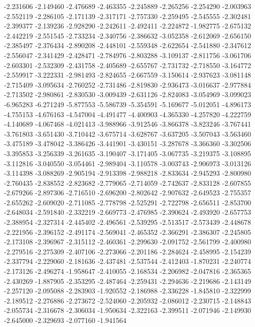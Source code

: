 -2.231606
-2.149460
-2.476689
-2.463355
-2.245889
-2.265256
-2.254290
-2.003963
-2.552119
-2.286105
-2.171139
-2.317171
-2.757330
-2.259495
-2.545555
-2.302481
-2.399377
-2.139236
-2.928290
-2.242611
-2.492411
-2.224872
-1.982775
-2.675132
-2.442219
-2.551545
-2.733234
-2.340756
-2.386632
-3.052358
-2.612069
-2.656150
-2.385497
-2.376434
-2.890208
-2.448101
-2.559348
-2.622654
-2.541880
-2.347612
-2.556047
-2.341429
-2.428471
-2.784976
-2.803288
-3.109137
-2.811756
-3.061706
-2.603301
-2.532309
-2.431758
-2.405689
-2.655767
-2.731732
-2.718550
-3.164772
-2.559917
-3.222331
-2.981493
-2.824655
-2.667559
-3.150614
-2.937623
-3.081148
-2.715409
-3.095634
-2.760252
-2.731486
-2.819830
-2.936473
-3.016637
-2.977884
-2.713502
-2.980861
-2.830530
-3.009439
-2.631126
-2.824083
-3.054969
-3.099023
-6.965283
-6.271249
-5.877553
-5.586739
-5.354591
-5.169677
-5.012051
-4.896173
-4.755153
-4.676163
-4.547004
-4.491477
-4.400903
-4.365330
-4.257820
-4.222759
-4.140689
-4.067468
-4.021413
-3.988966
-3.912546
-3.866378
-3.823246
-3.767441
-3.761803
-3.651430
-3.710442
-3.675714
-3.628767
-3.637205
-3.507043
-3.563460
-3.475189
-3.478042
-3.386426
-3.441901
-3.430151
-3.287678
-3.366360
-3.302506
-3.395853
-3.256339
-3.261635
-3.190407
-3.171405
-3.067735
-3.219375
-3.108895
-3.112816
-3.040550
-3.054461
-2.989404
-3.110578
-3.003743
-2.906973
-3.013126
-3.114398
-3.088269
-2.905194
-2.913398
-2.988218
-2.833634
-2.945293
-2.800980
-2.760435
-2.838552
-2.823682
-2.779065
-2.714059
-2.742637
-2.833128
-2.607855
-2.679266
-2.897306
-2.716510
-2.696200
-2.802642
-2.907632
-2.649523
-2.755357
-2.655262
-2.609020
-2.711085
-2.778798
-2.525291
-2.722798
-2.656511
-2.853700
-2.648034
-2.591840
-2.332219
-2.669773
-2.476985
-2.390624
-2.493920
-2.657753
-2.388954
-2.327314
-2.445402
-2.496561
-2.539295
-2.513517
-2.573439
-2.448678
-2.221956
-2.396152
-2.491174
-2.569041
-2.465352
-2.366291
-2.386307
-2.245805
-2.173108
-2.396967
-2.315112
-2.460361
-2.299630
-2.091752
-2.561799
-2.400980
-2.279516
-2.275309
-2.407106
-2.273066
-2.201186
-2.284624
-2.458995
-2.154239
-2.337794
-2.229060
-2.181636
-2.437481
-2.537544
-2.412403
-1.870231
-2.240774
-2.173126
-2.496274
-1.958647
-2.410055
-2.168534
-2.206982
-2.047816
-2.365365
-2.430269
-1.887905
-2.353295
-2.487464
-2.259431
-2.294636
-2.219686
-2.143149
-2.257120
-2.095088
-2.283903
-1.920552
-2.186988
-2.336228
-1.845810
-2.322999
-2.189512
-2.276886
-2.273672
-2.524060
-2.205932
-2.086012
-2.230715
-2.148843
-2.055734
-2.316678
-2.306034
-1.950634
-2.322163
-2.399511
-2.071946
-2.149930
-2.645000
-2.329693
-2.077160
-1.941564
